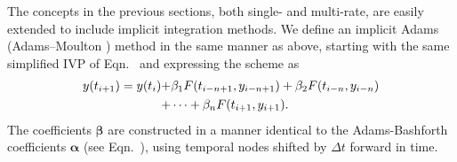 The concepts in the previous sections, both single- and multi-rate, are
easily extended to include implicit integration methods. We define an
implicit Adams (Adams--Moulton \cite{moulton1926new}) method in the same manner as above, starting
with the same simplified IVP of Eqn.~ and expressing the scheme as
\begin{align}
y(t_{i+1}) = y(t_{i}) +& \beta_{1}F(t_{i-n+1},y_{i-n+1}) + \beta_{2}F(t_{i-n},y_{i-n}) \notag \\
+& \cdots + \beta_{n}F(t_{i+1},y_{i+1}). \label{eq:am_general}
\end{align}
The coefficients $\boldsymbol{\beta}$ are constructed in a manner identical to
the Adams-Bashforth coefficients $\boldsymbol{\alpha}$ (see Eqn.~),
using temporal nodes shifted by $\Delta t$ forward in time.

